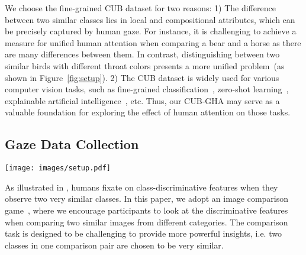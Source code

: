 \documentclass{bmvc2k}
\begin{document}
We choose the fine-grained CUB dataset for two reasons: 1) The difference between two similar classes lies in local and compositional attributes, which can be precisely captured by human gaze. For instance, it is challenging to achieve a measure for unified human attention when comparing a bear and a horse as there are many differences between them. In contrast, distinguishing between two similar birds with different throat colors presents a more unified problem~(as shown in Figure~\ref{fig:setup}). 2) The CUB dataset is widely used for various computer vision tasks, such as fine-grained classification~\cite{fu2017look,zheng2019looking,dubey2018maximum}, zero-shot learning~\cite{ALE,DEM,xian2018zero,xu2020attribute}, explainable artificial intelligence~\cite{kanehira2019learning,chen2019looks,anne2018grounding}, etc. Thus, our CUB-GHA may serve as a valuable foundation for exploring the effect of human attention on those tasks. 

\subsection{Gaze Data Collection}
\label{sec:HA maps}












\begin{figure*}[]
\begin{center}
   \texttt{[image: images/setup.pdf]}
\end{center}
\caption{\textbf{(a)} Eye tracker set-up: We use a Tobii Spectrum eye-tracker to capture gaze information at a high frequency of 1200 Hz. \textbf{(b)} Data collection: Step 1 represents a schematic overview of the image comparison task where two images of different species are freely viewed. In Step 2, a randomly selected example of one of the species is shown to the user for which gaze data is then collected. To gamify this setting, the user is asked to choose the correct class in Step 3. \textbf{(c)} Preparing human attention data: we visualize human attention in Gaussian-based saliency maps. 
   }
   \vspace{-5mm}
\label{fig:setup}
\end{figure*}


 As illustrated in \cite{Karessli_2017_CVPR}, humans fixate on class-discriminative features when they observe two very similar classes. In this paper, we adopt an image comparison game~\cite{Karessli_2017_CVPR}, where we encourage participants to look at the discriminative features when comparing two similar images from different categories. The comparison task is designed to be challenging to provide more powerful insights, i.e. two classes in one comparison pair are chosen to be very similar. 
\end{document}
